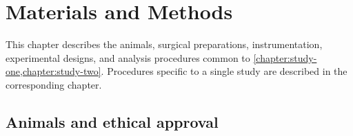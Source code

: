 \chapter{Materials and Methods}\label{chapter:methods}
\thispagestyle{myheadings}


	This chapter describes the animals, surgical preparations, instrumentation,
	experimental designs, and analysis procedures common to
	\cref{chapter:study-one,chapter:study-two}.
	Procedures specific to a single study are described in the corresponding
	chapter.

	\section{Animals and ethical approval}\label{section:methods:animals}

